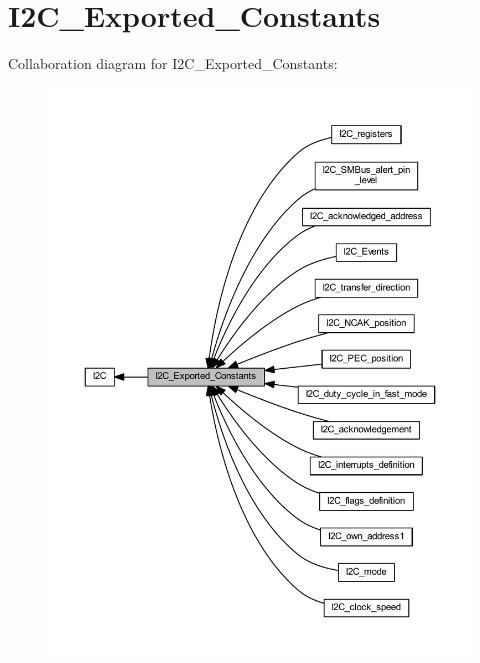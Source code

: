 \hypertarget{group___i2_c___exported___constants}{}\section{I2\+C\+\_\+\+Exported\+\_\+\+Constants}
\label{group___i2_c___exported___constants}
Collaboration diagram for I2\+C\+\_\+\+Exported\+\_\+\+Constants\+:
\nopagebreak
\begin{figure}[H]
\begin{center}
\leavevmode
\includegraphics[width=350pt]{group___i2_c___exported___constants}
\end{center}
\end{figure}
